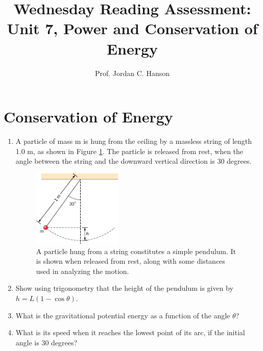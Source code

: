\documentclass{article}
\begin{document}
\title{Wednesday Reading Assessment: Unit 7, Power and Conservation of Energy}
\author{Prof. Jordan C. Hanson}

\maketitle

\section{Conservation of Energy}

\begin{enumerate}
\item A particle of mass m is hung from the ceiling by a massless string of length 1.0 m, as shown in Figure \ref{fig:pend}. The particle is released from rest, when the angle between the string and the downward vertical direction is 30 degrees.
\begin{figure}[ht]
\centering
\includegraphics[width=0.4\textwidth]{pend.png}
\caption{\label{fig:pend} A particle hung from a string constitutes a simple pendulum. It is shown when released from rest, along with some distances used in analyzing the motion.}
\end{figure}
\item Show using trigonometry that the height of the pendulum is given by $h = L(1-\cos\theta)$. \\ \vspace{2cm}
\item What is the gravitational potential energy as a function of the angle $\theta$? \\ \vspace{2cm}
\item What is its speed when it reaches the lowest point of its arc, if the initial angle is 30 degrees?
\end{enumerate}
\end{document}

